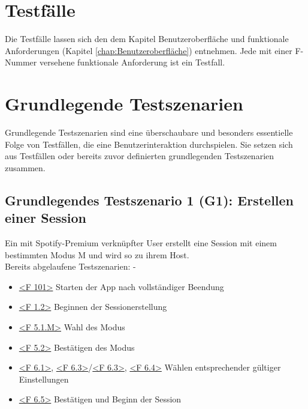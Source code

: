 \documentclass[oneside, ngerman]{sdqtechreport}
\begin{document}
\section{Testfälle}
\label{sec:Tests:Testfälle}

Die Testfälle lassen sich den dem Kapitel Benutzeroberfläche und funktionale Anforderungen (Kapitel \ref{chap:Benutzeroberfläche}) entnehmen. Jede mit einer F-Nummer versehene funktionale Anforderung ist ein Testfall.

\section{Grundlegende Testszenarien}
\label{sec:Tests:GrundlegendeTestszenarien}

Grundlegende Testszenarien sind eine überschaubare und besonders essentielle Folge von Testfällen, die eine Benutzerinteraktion durchspielen. Sie setzen sich aus Testfällen oder bereits zuvor definierten grundlegenden Testszenarien zusammen.

\subsection{Grundlegendes Testszenario 1 (G1): Erstellen einer Session}
\label{subsec:Tests:GrundlegendeTestszenarien:G1}
\hypertarget{G1}{}
\newcommand{\gOne}{\hyperlink{G1}{G1: Erstellen einer Session }}
Ein mit Spotify-Premium verknüpfter User erstellt eine Session mit einem bestimmten Modus M und wird so zu ihrem Host. \\
Bereits abgelaufene Testszenarien: -
\begin{itemize}
    \item \hyperlink{<F 101>}{<F 101>} Starten der App nach vollständiger Beendung
    \item \hyperlink{<F 1.2>}{<F 1.2>} Beginnen der Sessionerstellung
    \item \hyperlink{<F 5.1.M>}{<F 5.1.M>} Wahl des Modus
    \item \hyperlink{<F 5.2>}{<F 5.2>} Bestätigen des Modus
    \item \hyperlink{<F 6.1>}{<F 6.1>}, \hyperlink{<F 6.3>}{<F 6.3>}/\hyperlink{<F 6.3>}{<F 6.3>}, \hyperlink{<F 6.4>}{<F 6.4>} Wählen entsprechender gültiger Einstellungen
    \item \hyperlink{<F 6.5>}{<F 6.5>} Bestätigen und Beginn der Session
\end{itemize}
\end{document}
